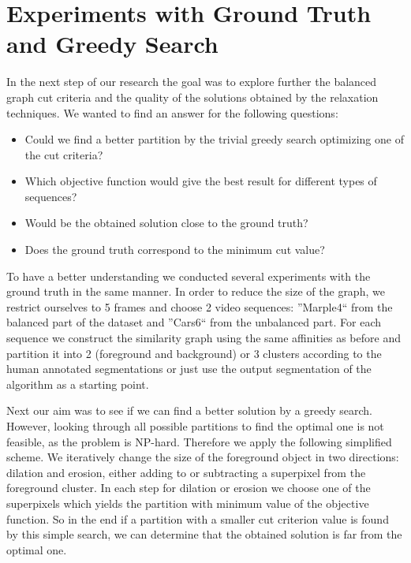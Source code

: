 \section{Experiments with Ground Truth and Greedy Search}
\label{sec:ch4_GTexp}
In the next step of our research the goal was to explore further the balanced graph cut criteria and the quality of the solutions obtained by the relaxation techniques. 
We wanted to find an answer for the following questions:
\begin{itemize}
\item Could we find a better partition by the trivial greedy search optimizing one of the cut criteria?
\item Which objective function would give the best result for different types of sequences?
\item Would be the obtained solution close to the ground truth?
\item Does the ground truth correspond to the minimum cut value?
\end{itemize}
To have a better understanding we conducted several experiments with the ground truth in the same manner.
In order to reduce the size of the graph, we restrict ourselves to 5 frames and choose 2 video sequences: ''Marple4`` from the balanced part of the dataset and ''Cars6`` from the unbalanced part.
For each sequence we construct the similarity graph using the same affinities as before and partition it into 2 (foreground and background) or 3 clusters according to 
the human annotated segmentations or just use the output segmentation of the algorithm
as a starting point.

Next our aim was to see if we can find a better solution by a greedy search. However, looking through all possible partitions to find the optimal one is not feasible, as the problem is NP-hard. 
Therefore we apply the following simplified scheme.
We iteratively change the size of the foreground object in two directions: dilation and erosion, either adding to or subtracting a superpixel from the foreground cluster. 
In each step for dilation or erosion we choose one of the superpixels which yields the partition with minimum value of the objective function.
So in the end if a partition with a smaller cut criterion value is found by this simple search, we can determine that the obtained solution is far from the optimal one.

